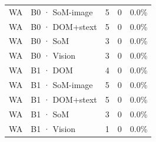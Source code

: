 \begin{table}[tp]
\begin{tabular}{@{}lllll@{}}
WA & B0 · SoM-image & 5 & 0 & 0.0\% \\
WA & B0 · DOM+\allowbreak{}stext & 5 & 0 & 0.0\% \\
WA & B0 · SoM & 3 & 0 & 0.0\% \\
WA & B0 · Vision & 3 & 0 & 0.0\% \\
WA & B1 · DOM & 4 & 0 & 0.0\% \\
WA & B1 · SoM-image & 5 & 0 & 0.0\% \\
WA & B1 · DOM+\allowbreak{}stext & 5 & 0 & 0.0\% \\
WA & B1 · SoM & 3 & 0 & 0.0\% \\
WA & B1 · Vision & 1 & 0 & 0.0\% \\
\bottomrule
\end{tabular}
\end{table}
